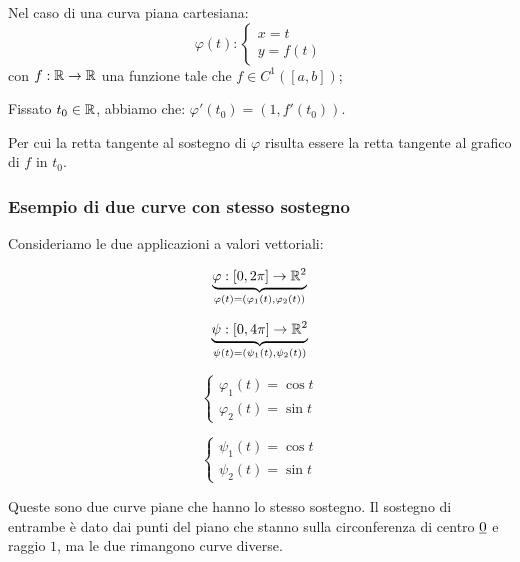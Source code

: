 Nel caso di una curva piana cartesiana:
\begin{equation*}
    \varphi(t):
    \begin{cases}
        x = t \\
        y = f(t)
    \end{cases}
\end{equation*}
con \(f: \mathbb{R} \to \mathbb{R} \) una funzione tale che \(f \in C^1([a,b])\);

Fissato \(t_0 \in \mathbb{R} \), abbiamo che: \(\varphi'(t_0) = (1,f'(t_0))\).

Per cui la retta tangente al sostegno di \(\varphi \) risulta essere la retta tangente al grafico di \(f\) in \(t_0\).

\filbreak{}

\subsubsection*{Esempio di due curve con stesso sostegno}

Consideriamo le due applicazioni a valori vettoriali:

\[
    \underbrace{\varphi:[0,2\pi] \rightarrow \mathbb{R}^{2}}_{\varphi(t) = (\varphi_1(t),\varphi_2(t))}
\]

\[
    \underbrace{\psi: [0,4\pi] \rightarrow  \mathbb{R}^{2}}_{\psi(t) = (\psi_1(t),\psi_2(t))}
\]


\begin{equation*}
    \begin{cases}
        \varphi_1(t) = \cos t \\
        \varphi_2(t) = \sin t
    \end{cases}
\end{equation*}


\begin{equation*}
    \begin{cases}
        \psi_1(t) = \cos t \\
        \psi_2(t) = \sin t
    \end{cases}
\end{equation*}

Queste sono due curve piane che hanno lo stesso sostegno. Il sostegno di entrambe è dato dai punti del piano che stanno sulla circonferenza di centro \(\underline{0} \) e raggio \(1\), ma le due rimangono curve diverse.

